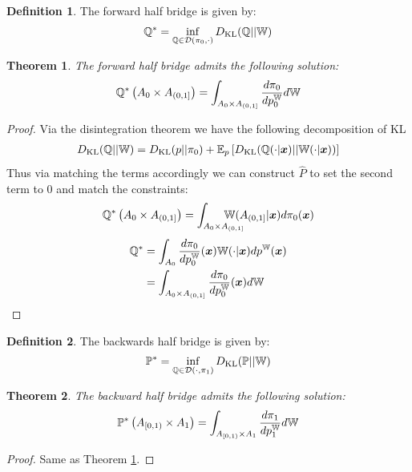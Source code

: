 \documentclass[a4paper,12pt,twoside,openright]{report}
\newtheorem{theorem}{Theorem}
\theoremstyle{definition}
\newtheorem{definition}{Definition}[section]
\begin{document}
\begin{definition}
The forward half bridge is given by:
    \begin{align}
        {{\mathbb{Q}}}^{*} = \inf_{{\mathbb{Q}}  \in {\mathcal{D}}(\pi_0, \cdot)} D_{\mathrm{KL}} ({\mathbb{Q}} || \mathbb{W}) 
    \end{align}
\end{definition}
\begin{theorem}\label{thrm:half_bridge_forward}
    The forward half bridge admits the following solution: 
\begin{align}
    {{\mathbb{Q}}}^{*}\left(A_0 \times A_{(0,1]}\right) =  \int_{A_0\times A_{(0,1]}} \frac{d \pi_0}{ dp_0^{\mathbb{W}}} d\mathbb{W}
\end{align}
\end{theorem}
\begin{proof}
Via the disintegration theorem we have the following decomposition of KL
\begin{align}
    D_{\mathrm{KL}}({\mathbb{Q}} || \mathbb{W}) = D_{\mathrm{KL}}(p|| \pi_0 )  + \mathbb{E}_p\left[D_{\mathrm{KL}}({\mathbb{Q}}(\cdot| {\bm{x}}) || \mathbb{W}(\cdot | {\bm{x}}))\right] \nonumber
\end{align}
Thus via matching the terms accordingly we can construct $\hat{P}$ to set the second term to $0$ and match the constraints:
\begin{align}
    {\Q}^{*}\left(A_0 \times A_{(0,1]}\right) = \int_{A_0 \times A_{(0,1]}}\!\!\!\!\!\!\!\!\!\!\!\!\W(A_{(0,1]} | \vx) d\pi_0(\vx)
\end{align}
\begin{align}
    {{\mathbb{Q}}}^{*} &= \int_{A_0}  \frac{d\pi_0}{dp_0^{\mathbb{W}}}({\bm{x}})   \mathbb{W}(\cdot | {\bm{x}}) d p^{\mathbb{W}}({\bm{x}}) \nonumber \\
    &= \int_{A_0 \times A_{(0,1]} }  \frac{d\pi_0}{dp_0^{\mathbb{W}}}({\bm{x}})  d \mathbb{W}
\end{align}
\end{proof}
\begin{definition}
The backwards half bridge is given by:
    \begin{align}
        {{\mathbb{P}}}^{*} = \inf_{{\mathbb{Q}}  \in {\mathcal{D}}(\cdot, \pi_1)} D_{\mathrm{KL}} ({\mathbb{P}} || \mathbb{W}) 
    \end{align}
\end{definition}
\begin{theorem}\label{thrm:half_bridge_backward}
     The backward half bridge admits the following solution: 
\begin{align}
    {{\mathbb{P}}}^{*}\left( A_{[0,1)} \times A_1\right) =  \int_{ A_{[0,1)} \times A_1}  \frac{d \pi_1}{ d p_1^{\mathbb{W}}} d\mathbb{W}
\end{align}

\end{theorem}
\begin{proof}
Same as Theorem \ref{thrm:half_bridge_forward}.
\end{proof}
\end{document}
